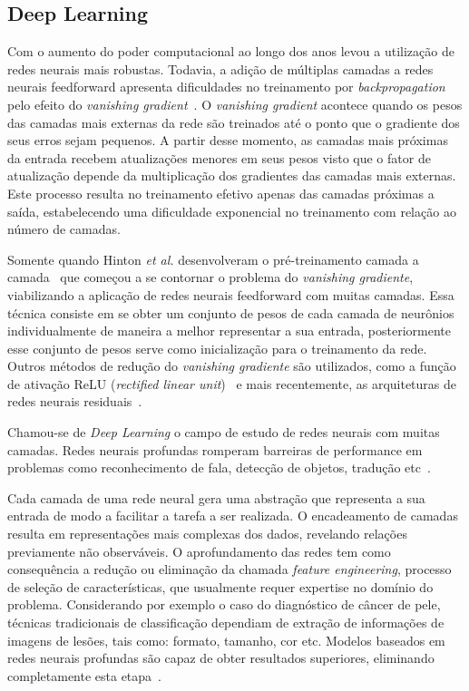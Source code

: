 \subsection{Deep Learning}

Com o aumento do poder computacional ao longo dos anos levou a utilização de redes neurais mais robustas.
Todavia, a adição de múltiplas camadas a redes neurais feedforward apresenta dificuldades no treinamento por
\textit{backpropagation} pelo efeito do \textit{vanishing gradient}~\cite{hochreiter98}.
O \textit{vanishing gradient} acontece quando os pesos das camadas mais externas da rede são treinados até o ponto que
o gradiente dos seus erros sejam pequenos.
A partir desse momento, as camadas mais próximas da entrada recebem atualizações menores em seus pesos visto que o fator
de atualização depende da multiplicação dos gradientes das camadas mais externas.
Este processo resulta no treinamento efetivo apenas das camadas próximas a saída, estabelecendo uma dificuldade
exponencial no treinamento com relação ao número de camadas.

Somente quando Hinton \textit{et al.} desenvolveram o pré-treinamento camada a camada~\cite{hinton06} que começou a se
contornar o problema do \textit{vanishing gradiente}, viabilizando a aplicação de redes neurais feedforward com muitas
camadas.
Essa técnica consiste em se obter um conjunto de pesos de cada camada de neurônios individualmente de maneira a melhor
representar a sua entrada, posteriormente esse conjunto de pesos serve como inicialização para o treinamento da rede.
Outros métodos de redução do \textit{vanishing gradiente} são utilizados, como a função de ativação ReLU
(\textit{rectified linear unit})~\cite{nair10} e mais recentemente, as arquiteturas de redes neurais
residuais~\cite{he16}.

Chamou-se de \textit{Deep Learning} o campo de estudo de redes neurais com muitas camadas.
Redes neurais profundas romperam barreiras de performance em problemas como reconhecimento de fala, detecção de
objetos, tradução etc~\cite{lecun15}.

Cada camada de uma rede neural gera uma abstração que representa a sua entrada de modo a facilitar a tarefa a ser
realizada.
O encadeamento de camadas resulta em representações mais complexas dos dados, revelando relações previamente não
observáveis.
O aprofundamento das redes tem como consequência a redução ou eliminação da chamada \textit{feature engineering},
processo de seleção de características, que usualmente requer expertise no domínio do problema.
Considerando por exemplo o caso do diagnóstico de câncer de pele, técnicas tradicionais de classificação dependiam de
extração de informações de imagens de lesões, tais como: formato, tamanho, cor etc.
Modelos baseados em redes neurais profundas são capaz de obter resultados superiores, eliminando completamente esta
etapa~\cite{esteva17}.

